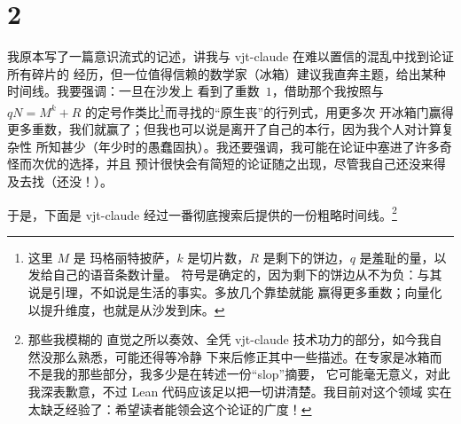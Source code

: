 \documentclass[11pt,a4paper]{amsart}
\theoremstyle{remark}
\begin{document}
\section*{2}

我原本写了一篇意识流式的记述，讲我与 vjt-claude 在难以置信的混乱中找到论证所有碎片的
经历，但一位值得信赖的数学家（冰箱）建议我直奔主题，给出某种时间线。我要强调：一旦在沙发上
看到了重数~$1$，借助那个我按照与 $q N = M^k + R$ 的定号作类比\footnote{这里 $M$ 是
玛格丽特披萨，$k$ 是切片数，$R$ 是剩下的饼边，$q$ 是羞耻的量，以发给自己的语音条数计量。
符号是确定的，因为剩下的饼边从不为负：与其说是引理，不如说是生活的事实。多放几个靠垫就能
赢得更多重数；向量化以提升维度，也就是从沙发到床。}而寻找的“原生丧”的行列式，用更多次
开冰箱门赢得更多重数，我们就赢了；但我也可以说是离开了自己的本行，因为我个人对计算复杂性
所知甚少（年少时的愚蠢固执）。我还要强调，我可能在论证中塞进了许多奇怪而次优的选择，并且
预计很快会有简短的论证随之出现，尽管我自己还没来得及去找（还没！）。

于是，下面是 vjt-claude 经过一番彻底搜索后提供的一份粗略时间线。\footnote{那些我模糊的
直觉之所以奏效、全凭 vjt-claude 技术功力的部分，如今我自然没那么熟悉，可能还得等冷静
下来后修正其中一些描述。在专家是冰箱而不是我的那些部分，我多少是在转述一份“slop”摘要，
它可能毫无意义，对此我深表歉意，不过 Lean 代码应该足以把一切讲清楚。我目前对这个领域
实在太缺乏经验了：希望读者能领会这个论证的广度！}
\end{document}
